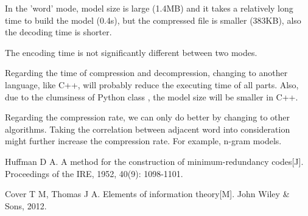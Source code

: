 \documentclass[journal, a4paper]{IEEEtran}
\begin{document}
    In the 'word' mode, model size is large (1.4MB) and it takes a relatively long time to build the model (0.4s), but the compressed file is smaller (383KB), also the decoding time is shorter.
    
    The encoding time is not significantly different between two modes.
    
    Regarding the time of compression and decompression, changing to another language, like C++, will probably reduce the executing time of all parts. Also, due to the clumsiness of Python class , the model size will be smaller in C++.
    
    Regarding the compression rate, we can only do better by changing to other algorithms. Taking the correlation between adjacent word into consideration might further increase the compression rate. For example, n-gram models.


\begin{thebibliography}{5}

	Huffman D A. A method for the construction of minimum-redundancy codes[J]. Proceedings of the IRE, 1952, 40(9): 1098-1101.

    Cover T M, Thomas J A. Elements of information theory[M]. John Wiley \& Sons, 2012.

\end{thebibliography}

\end{document}
